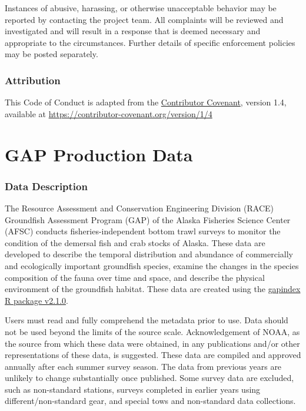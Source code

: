 \documentclass[
  letterpaper,
  oneside,
  open=any]{scrbook}
\begin{document}
Instances of abusive, harassing, or otherwise unacceptable behavior may
be reported by contacting the project team. All complaints will be
reviewed and investigated and will result in a response that is deemed
necessary and appropriate to the circumstances. Further details of
specific enforcement policies may be posted separately.

\section{Attribution}\label{attribution}

This Code of Conduct is adapted from the
\href{https://contributor-covenant.org}{Contributor Covenant}, version
1.4, available at
\href{https://contributor-covenant.org/version/1/4/}{https://contributor-covenant.org/version/1/4}

\part{GAP Production Data}

\section*{Data Description}\label{data-description}


The Resource Assessment and Conservation Engineering Division (RACE)
Groundfish Assessment Program (GAP) of the Alaska Fisheries Science
Center (AFSC) conducts fisheries-independent bottom trawl surveys to
monitor the condition of the demersal fish and crab stocks of Alaska.
These data are developed to describe the temporal distribution and
abundance of commercially and ecologically important groundfish species,
examine the changes in the species composition of the fauna over time
and space, and describe the physical environment of the groundfish
habitat. These data are created using the
\href{https://afsc-gap-products.github.io/gapindex/index.html}{gapindex
R package v2.1.0}.

Users must read and fully comprehend the metadata prior to use. Data
should not be used beyond the limits of the source scale.
Acknowledgement of NOAA, as the source from which these data were
obtained, in any publications and/or other representations of these
data, is suggested. These data are compiled and approved annually after
each summer survey season. The data from previous years are unlikely to
change substantially once published. Some survey data are excluded, such
as non-standard stations, surveys completed in earlier years using
different/non-standard gear, and special tows and non-standard data
collections.
\end{document}
